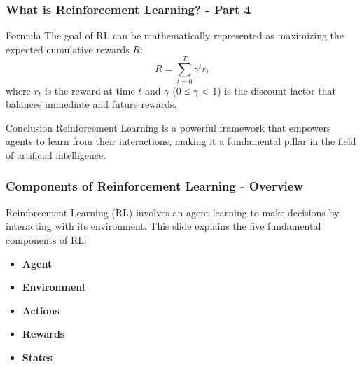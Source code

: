 \documentclass[aspectratio=169]{beamer}
\begin{document}
\begin{frame}[fragile]
    \frametitle{What is Reinforcement Learning? - Part 4}
    \begin{block}{Formula}
        The goal of RL can be mathematically represented as maximizing the expected cumulative rewards \( R \):
        \begin{equation}
            R = \sum_{t=0}^{T} \gamma^t r_t
        \end{equation}
        where \( r_t \) is the reward at time \( t \) and \( \gamma \) (0 ≤ \( \gamma \) < 1) is the discount factor that balances immediate and future rewards.
    \end{block}
    \begin{block}{Conclusion}
        Reinforcement Learning is a powerful framework that empowers agents to learn from their interactions, making it a fundamental pillar in the field of artificial intelligence.
    \end{block}
\end{frame}

\begin{frame}[fragile]
    \frametitle{Components of Reinforcement Learning - Overview}
    Reinforcement Learning (RL) involves an agent learning to make decisions by interacting with its environment. This slide explains the five fundamental components of RL:
    
    \begin{itemize}
        \item \textbf{Agent}
        \item \textbf{Environment}
        \item \textbf{Actions}
        \item \textbf{Rewards}
        \item \textbf{States}
    \end{itemize}
\end{frame}
\end{document}
